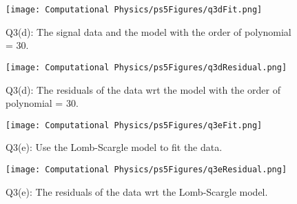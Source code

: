 \documentclass[11pt]{article}
\begin{document}
\begin{figure}[b!]
\centering
\texttt{[image: Computational Physics/ps5Figures/q3dFit.png]}
\caption{Q3(d): The signal data and the model with the order of polynomial = 30.}
  \label{fig:Q3dFit}
\end{figure}

\begin{figure}[b!]
\centering
\texttt{[image: Computational Physics/ps5Figures/q3dResidual.png]}
\caption{Q3(d): The residuals of the data wrt the model with the order of polynomial = 30.}
  \label{fig:Q3dResidual}
\end{figure}

\begin{figure}[b!]
\centering
\texttt{[image: Computational Physics/ps5Figures/q3eFit.png]}
\caption{Q3(e): Use the Lomb-Scargle model to fit the data.}
  \label{fig:Q3eFit}
\end{figure}

\begin{figure}[b!]
\centering
\texttt{[image: Computational Physics/ps5Figures/q3eResidual.png]}
\caption{Q3(e): The residuals of the data wrt the Lomb-Scargle model.}
  \label{fig:Q3eResidual}
\end{figure}



\end{document}
